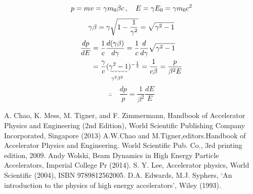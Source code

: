 \documentclass[10pt,a4paper]{ltjsarticle}
\begin{document}
\begin{align}
    p = mv = \gamma m_0 \beta c\,  , \quad E = \gamma E_0 = \gamma m_0 c^2 \notag
\end{align}
%
\begin{equation}
    \gamma \beta = \gamma \sqrt{1-\frac{1}{\gamma^2}} \notag = \sqrt{\gamma^2 -1} \notag
\end{equation}
%
\begin{align}
    \frac{dp}{dE} & = \frac{1}{c}\frac{d(\gamma \beta)}{d\gamma} = \frac{1}{c}\frac{d}{d\gamma}\sqrt{\gamma^2 -1} \notag \\
    & = \frac{\gamma}{c} \underset{\gamma^2\beta^2}{(\uwave{\gamma^2 -1}})^{-\frac{1}{2}} = \frac{1}{c\beta}
    = \frac{p}{\beta^2 E}\notag
\end{align}
%
\begin{equation}
    \therefore \quad \frac{dp}{p} = \frac{1}{\beta^2}\frac{dE}{E}
\end{equation}

%
\begin{thebibliography}{9}
  A. Chao, K. Mess, M. Tigner, and F. Zimmermann, Handbook of Accelerator Physics and Engineering (2nd Edition), World Scientific Publishing Company Incorporated, Singapore (2013)
  A.W.Chao and M.Tigner,editors.Handbook of Accelerator Physics and Engineering. World Scientific Pub. Co., 3rd printing edition, 2009.
  Andy Wolski, Beam Dynamics in High Energy Particle Accelerators,  Imperial College Pr (2014).
  S. Y. Lee, Accelerator physics, World Scientific (2004), ISBN 9789812562005.
  D.A. Edwards, M.J. Syphers, `An introduction to the physics of high energy accelerators', Wiley (1993).
\end{thebibliography}
%
\end{document}
